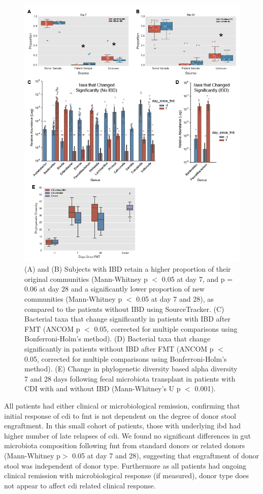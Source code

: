 \begin{figure}[htbp]
\includegraphics[width=0.95\columnwidth]{fmt-figures/figure-2}
\caption[SourceTracker and differential abundance comparison between IBD and non-IBD affected subjects.]{(A) and (B) Subjects with IBD retain a higher proportion of their original communities (Mann-Whitney p $<$ 0.05 at day 7, and p = 0.06 at day 28 and a significantly lower proportion of new communities (Mann-Whitney p $<$ 0.05 at day 7 and 28), as compared to the patients without IBD using SourceTracker. (C) Bacterial taxa that change significantly in patients with IBD after FMT (ANCOM p $<$ 0.05, corrected for multiple comparisons using Bonferroni-Holm's method). (D) Bacterial taxa that change significantly in patients without IBD after FMT (ANCOM p $<$ 0.05, corrected for multiple comparisons using Bonferroni-Holm's method). (E) Change in phylogenetic diversity based alpha diversity 7 and 28 days following fecal microbiota transplant in patients with CDI with and without IBD (Mann-Whitney's U p $<$ 0.001). }
\label{fmt-fig2}
\end{figure}

All patients had either clinical or microbiological remission, confirming that initial response of \gls{cdi} to \gls{fmt} is not dependent on the degree of donor stool engraftment. In this small cohort of patients, those with underlying \gls{ibd} had higher number of late relapses of \gls{cdi}. We found no significant differences in gut microbiota composition following \gls{fmt} from standard donors or related donors (Mann-Whitney p$>$ 0.05 at day 7 and 28), suggesting that engraftment of donor stool was independent of donor type. Furthermore as all patients had ongoing clinical remission with microbiological response (if measured), donor type does not appear to affect \gls{cdi} related clinical response.

